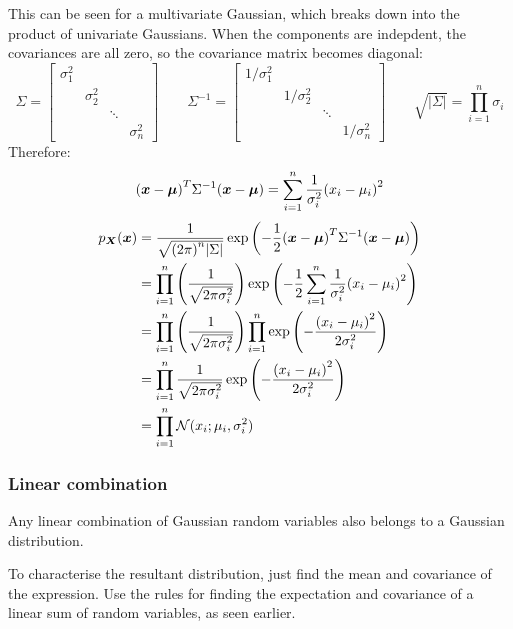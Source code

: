 \documentclass[../../main.tex]{subfiles}
\begin{document}
This can be seen for a multivariate Gaussian, which breaks down into the product of univariate Gaussians. When the components are indepdent, the covariances are all zero, so the covariance matrix becomes diagonal:
\[ \Sigma = \left[\begin{matrix}
        \sigma_1^2 & & & \\
                   & \sigma_2^2 & & \\
                   & & \ddots & \\
                   & & & \sigma_n^2
\end{matrix}\right] \quad\quad
\Sigma^{-1} = \left[\begin{matrix}
        1/\sigma_1^2 & & & \\
                   & 1/\sigma_2^2 & & \\
                   & & \ddots & \\
                   & & & 1/\sigma_n^2
\end{matrix}\right] \quad\quad
\sqrt{\left|\Sigma\right|} = \prod_{i=1}^n \sigma_i
\]
Therefore:
\[
{(\bm{x}-\bm{\mu})}^T\Sigma^{-1}(\bm{x}-\bm{\mu}) =
\sum_{i=1}^n \frac{1}{\sigma_i^2}{(x_i-\mu_i)}^2
\]
\begin{align*}
p_{\bm{X}}(\bm{x})
&=
\frac{1}{\sqrt{{\left(2\pi\right)}^n{\left|\Sigma \right|}}}
\exp{\left(-\frac{1}{2}{( \bm{x} - \bm{\mu} )}^T\Sigma^{-1}( \bm{x} - \bm{\mu} )\right)} \\
&=
\prod_{i=1}^n \left( \frac{1}{\sqrt{2\pi\sigma_i^2}}\right)
\exp\left({-\frac{1}{2}}
\sum_{i=1}^n \frac{1}{\sigma_i^2}{(x_i-\mu_i)}^2 \right) \\
&=
\prod_{i=1}^n \left( \frac{1}{\sqrt{2\pi\sigma_i^2}}\right)
\prod_{i=1}^n \exp\left(
-\frac{{(x_i-\mu_i)}^2}{2\sigma_i^2} \right) \\
&=
\prod_{i=1}^n \frac{1}{\sqrt{2\pi\sigma_i^2}}
\exp \left(
-\frac{{(x_i-\mu_i)}^2}{2\sigma_i^2} \right) \\
&=
\prod_{i=1}^n \mathcal{N}(x_i;\mu_i, \sigma_i^2)
\end{align*}

\subsubsection{Linear combination}

Any linear combination of Gaussian random variables also belongs to a Gaussian distribution.

To characterise the resultant distribution, just find the mean and covariance of the expression.
Use the rules for finding the expectation and covariance of a linear sum of random variables, as seen earlier.
\end{document}
